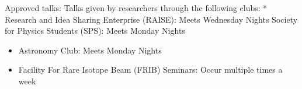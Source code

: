 \documentclass[11pt]{article}
\begin{document}
Approved talks: Talks given by researchers through the following clubs:
* Research and Idea Sharing Enterprise (RAISE)\hspace{0pt}: Meets
Wednesday Nights Society for Physics Students (SPS)\hspace{0pt}: Meets
Monday Nights

\begin{itemize}
\item
  Astronomy Club\hspace{0pt}: Meets Monday Nights
\item
  Facility For Rare Isotope Beam (FRIB) Seminars: \hspace{0pt}Occur
  multiple times a week
\end{itemize}

    


    
    
    
\end{document}

